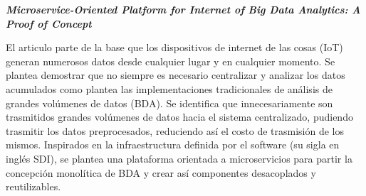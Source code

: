 
\textbf{\emph{Microservice-Oriented Platform for Internet of Big
Data Analytics: A Proof of Concept}} \cite{li_microservice-oriented_2019} 
 
El articulo parte de la base que los dispositivos de internet de las cosas (IoT) generan numerosos datos desde cualquier lugar y en cualquier momento. Se plantea demostrar que no siempre es necesario centralizar y analizar los datos acumulados como plantea las implementaciones tradicionales de análisis de grandes volúmenes de datos (BDA).
Se identifica que innecesariamente son trasmitidos grandes volúmenes de datos hacia el sistema centralizado, pudiendo trasmitir los datos preprocesados, reduciendo así el costo de trasmisión de los mismos. Inspirados en la infraestructura definida por el software (su sigla en inglés SDI), se plantea una plataforma orientada a microservicios para partir la concepción monolítica de BDA y crear así componentes desacoplados y reutilizables.